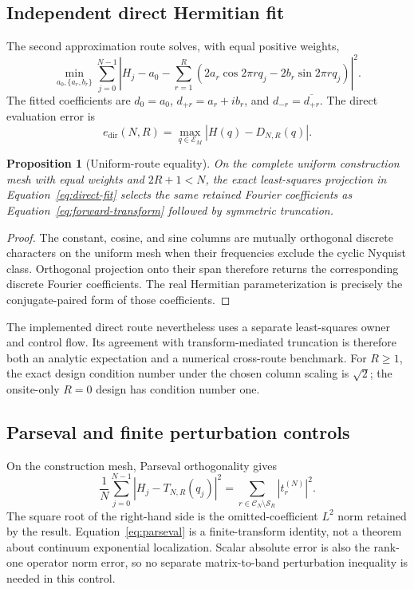 \documentclass[11pt]{article}
\newtheorem{proposition}{Proposition}
\begin{document}
\subsection{Independent direct Hermitian fit}

The second approximation route solves, with equal positive weights,
\begin{equation}
 \min_{a_0,\{a_r,b_r\}}
 \sum_{j=0}^{N-1}
 \left|H_j-a_0-
 \sum_{r=1}^{R}\left(2a_r\cos 2\pi rq_j-2b_r\sin 2\pi rq_j\right)\right|^2.
 \label{eq:direct-fit}
\end{equation}
The fitted coefficients are $d_0=a_0$,
$d_{+r}=a_r+ib_r$, and $d_{-r}=\overline{d_{+r}}$.  The direct evaluation error is
\begin{equation}
 e_{\mathrm{dir}}(N,R)=
 \max_{q\in\mathcal E_M}|H(q)-D_{N,R}(q)|.
\end{equation}

\begin{proposition}[Uniform-route equality]
On the complete uniform construction mesh with equal weights and
$2R+1<N$, the exact least-squares projection in Equation~\eqref{eq:direct-fit} selects
the same retained Fourier coefficients as Equation~\eqref{eq:forward-transform} followed
by symmetric truncation.
\end{proposition}

\begin{proof}
The constant, cosine, and sine columns are mutually orthogonal discrete characters on
the uniform mesh when their frequencies exclude the cyclic Nyquist class.  Orthogonal
projection onto their span therefore returns the corresponding discrete Fourier
coefficients.  The real Hermitian parameterization is precisely the conjugate-paired
form of those coefficients.
\end{proof}

The implemented direct route nevertheless uses a separate least-squares owner and
control flow.  Its agreement with transform-mediated truncation is therefore both an
analytic expectation and a numerical cross-route benchmark.  For $R\ge1$, the exact
design condition number under the chosen column scaling is $\sqrt2$; the onsite-only
$R=0$ design has condition number one.

\subsection{Parseval and finite perturbation controls}

On the construction mesh, Parseval orthogonality gives
\begin{equation}
 \frac1N\sum_{j=0}^{N-1}|H_j-T_{N,R}(q_j)|^2
 =\sum_{r\in\mathcal C_N\setminus\mathcal S_R}|t_r^{(N)}|^2.
 \label{eq:parseval}
\end{equation}
The square root of the right-hand side is the omitted-coefficient $L^2$ norm retained by
the result.  Equation~\eqref{eq:parseval} is a finite-transform identity, not a theorem
about continuum exponential localization.  Scalar absolute error is also the rank-one
operator norm error, so no separate matrix-to-band perturbation inequality is needed in
this control.
\end{document}

